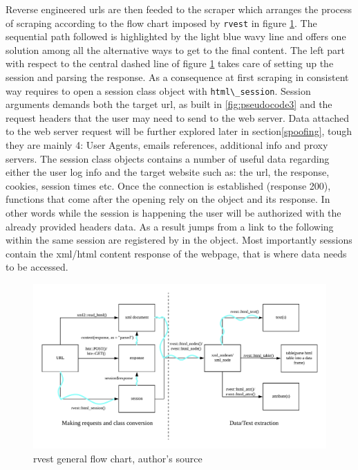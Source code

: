 \documentclass[
  12pt,
  a4paper,
  oneside]{book}
\newcommand{\passthrough}[1]{#1}
\theoremstyle{definition}
\theoremstyle{definition}
\theoremstyle{definition}
\theoremstyle{remark}
\begin{document}
Reverse engineered urls are then feeded to the scraper which arranges the process of scraping according to the flow chart imposed by \passthrough{\lstinline!rvest!} in figure \ref{fig:rvestflowchart}. The sequential path followed is highlighted by the light blue wavy line and offers one solution among all the alternative ways to get to the final content. The left part with respect to the central dashed line of figure \ref{fig:rvestflowchart} takes care of setting up the session and parsing the response. As a consequence at first scraping in consistent way requires to open a session class object with \passthrough{\lstinline!html\_session!}. Session arguments demands both the target url, as built in \ref{fig:pseudocode3} and the request headers that the user may need to send to the web server. Data attached to the web server request will be further explored later in section\ref{spoofing}, tough they are mainly 4: User Agents, emails references, additional info and proxy servers. The session class objects contains a number of useful data regarding either the user log info and the target website such as: the url, the response, cookies, session times etc. Once the connection is established (response 200), functions that come after the opening rely on the object and its response. In other words while the session is happening the user will be authorized with the already provided headers data. As a result jumps from a link to the following within the same session are registered by in the object. Most importantly sessions contain the xml/html content response of the webpage, that is where data needs to be accessed.

\begin{figure}
\centering
\includegraphics{images/workflow.png}
\caption{\label{fig:rvestflowchart}rvest general flow chart, author's source}
\end{figure}
\end{document}
